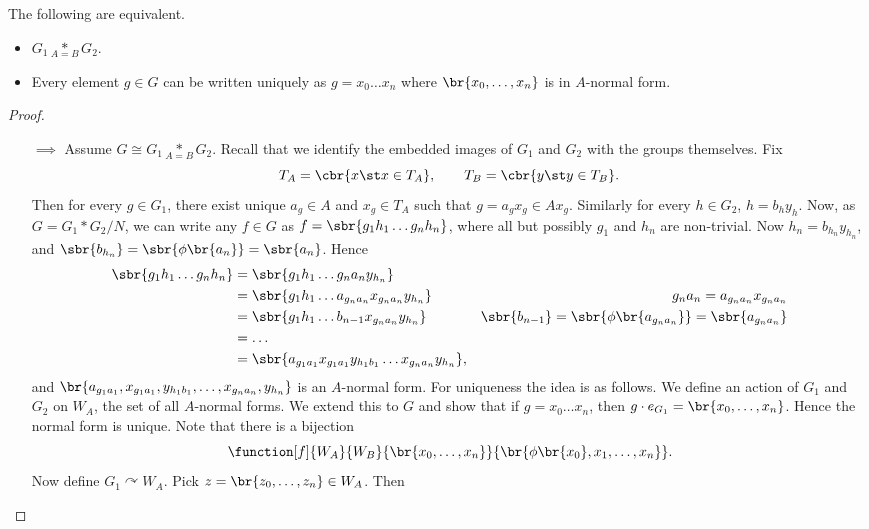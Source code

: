 \pagebreak

\begin{theorem}
The following are equivalent.
\begin{itemize}
\item $ G_1 \underset{A = B}{*} G_2 $.
\item Every element $ g \in G $ can be written uniquely as $ g = x_0 \dots x_n $ where $ \br{x_0, \dots, x_n} $ is in $ A $-normal form.
\end{itemize}
\end{theorem}

\begin{proof}
\hfill
\begin{itemize}
\item[$ \implies $] Assume $ G \cong G_1 \underset{A = B}{*} G_2 $. Recall that we identify the embedded images of $ G_1 $ and $ G_2 $ with the groups themselves. Fix
$$ T_A = \cbr{x \st x \in T_A}, \qquad T_B = \cbr{y \st y \in T_B}. $$
Then for every $ g \in G_1 $, there exist unique $ a_g \in A $ and $ x_g \in T_A $ such that $ g = a_gx_g \in Ax_g $. Similarly for every $ h \in G_2 $, $ h = b_hy_h $. Now, as $ G = G_1 * G_2 / N $, we can write any $ f \in G $ as $ f = \sbr{g_1h_1 \dots g_nh_n} $, where all but possibly $ g_1 $ and $ h_n $ are non-trivial. Now $ h_n = b_{h_n}y_{h_n} $, and $ \sbr{b_{h_n}} = \sbr{\phi\br{a_n}} = \sbr{a_n} $. Hence
\begin{align*}
\sbr{g_1h_1 \dots g_nh_n}
& = \sbr{g_1h_1 \dots g_na_ny_{h_n}} \\
& = \sbr{g_1h_1 \dots a_{g_na_n}x_{g_na_n}y_{h_n}} & g_na_n = a_{g_na_n}x_{g_na_n} \\
& = \sbr{g_1h_1 \dots b_{n - 1}x_{g_na_n}y_{h_n}} & \sbr{b_{n - 1}} = \sbr{\phi\br{a_{g_na_n}}} = \sbr{a_{g_na_n}} \\
& = \dots \\
& = \sbr{a_{g_1a_1}x_{g_1a_1}y_{h_1b_1} \dots x_{g_na_n}y_{h_n}},
\end{align*}
and $ \br{a_{g_1a_1}, x_{g_1a_1}, y_{h_1b_1}, \dots, x_{g_na_n}, y_{h_n}} $ is an $ A $-normal form. For uniqueness the idea is as follows. We define an action of $ G_1 $ and $ G_2 $ on $ W_A $, the set of all $ A $-normal forms. We extend this to $ G $ and show that if $ g = x_0 \dots x_n $, then $ g \cdot e_{G_1} = \br{x_0, \dots, x_n} $. Hence the normal form is unique. Note that there is a bijection
$$ \function[f]{W_A}{W_B}{\br{x_0, \dots, x_n}}{\br{\phi\br{x_0}, x_1, \dots, x_n}}. $$
Now define $ G_1 \curvearrowright W_A $. Pick $ z = \br{z_0, \dots, z_n} \in W_A $. Then

\end{itemize}
\end{proof}
